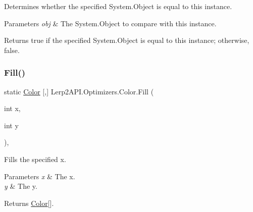 Determines whether the specified System.\+Object is equal to this instance. 


\begin{DoxyParams}{Parameters}
{\em obj} & The System.\+Object to compare with this instance.\\
\hline
\end{DoxyParams}
\begin{DoxyReturn}{Returns}
{\ttfamily true} if the specified System.\+Object is equal to this instance; otherwise, {\ttfamily false}.
\end{DoxyReturn}
\mbox{\label{struct_lerp2_a_p_i_1_1_optimizers_1_1_color_a2f4d0ecb2a2e2209e09a5ce61047a8cf}} 
\subsubsection{\texorpdfstring{Fill()}{Fill()}}
{\footnotesize\ttfamily static \hyperlink{struct_lerp2_a_p_i_1_1_optimizers_1_1_color}{Color} \mbox{[},\mbox{]} Lerp2\+A\+P\+I.\+Optimizers.\+Color.\+Fill (\begin{DoxyParamCaption}\item[{int}]{x,  }\item[{int}]{y }\end{DoxyParamCaption})\hspace{0.3cm}{\ttfamily [inline]}, {\ttfamily [static]}}



Fills the specified x. 


\begin{DoxyParams}{Parameters}
{\em x} & The x.\\
\hline
{\em y} & The y.\\
\hline
\end{DoxyParams}
\begin{DoxyReturn}{Returns}
\hyperlink{struct_lerp2_a_p_i_1_1_optimizers_1_1_color}{Color}\mbox{[}\mbox{]}.
\end{DoxyReturn}
\mbox{\label{struct_lerp2_a_p_i_1_1_optimizers_1_1_color_a20fce2c3b5954502dd2c24dded3fb8a0}} 
